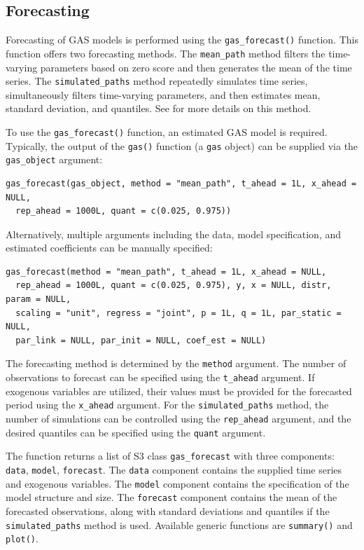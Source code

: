 \subsection{Forecasting}\label{forecasting}

Forecasting of GAS models is performed using the \texttt{gas\_forecast()} function. This function offers two forecasting methods. The \texttt{mean\_path} method filters the time-varying parameters based on zero score and then generates the mean of the time series. The \texttt{simulated\_paths} method repeatedly simulates time series, simultaneously filters time-varying parameters, and then estimates mean, standard deviation, and quantiles. See \citet{Blasques2016a} for more details on this method.

To use the \texttt{gas\_forecast()} function, an estimated GAS model is required. Typically, the output of the \texttt{gas()} function (a \texttt{gas} object) can be supplied via the \texttt{gas\_object} argument:

\begin{verbatim}
gas_forecast(gas_object, method = "mean_path", t_ahead = 1L, x_ahead = NULL,
  rep_ahead = 1000L, quant = c(0.025, 0.975))
\end{verbatim}

Alternatively, multiple arguments including the data, model specification, and estimated coefficients can be manually specified:

\begin{verbatim}
gas_forecast(method = "mean_path", t_ahead = 1L, x_ahead = NULL, 
  rep_ahead = 1000L, quant = c(0.025, 0.975), y, x = NULL, distr, param = NULL,
  scaling = "unit", regress = "joint", p = 1L, q = 1L, par_static = NULL,
  par_link = NULL, par_init = NULL, coef_est = NULL)
\end{verbatim}

The forecasting method is determined by the \texttt{method} argument. The number of observations to forecast can be specified using the \texttt{t\_ahead} argument. If exogenous variables are utilized, their values must be provided for the forecasted period using the \texttt{x\_ahead} argument. For the \texttt{simulated\_paths} method, the number of simulations can be controlled using the \texttt{rep\_ahead} argument, and the desired quantiles can be specified using the \texttt{quant} argument.

The function returns a list of S3 class \texttt{gas\_forecast} with three components: \texttt{data}, \texttt{model}, \texttt{forecast}. The \texttt{data} component contains the supplied time series and exogenous variables. The \texttt{model} component contains the specification of the model structure and size. The \texttt{forecast} component contains the mean of the forecasted observations, along with standard deviations and quantiles if the \texttt{simulated\_paths} method is used. Available generic functions are \texttt{summary()} and \texttt{plot()}.

